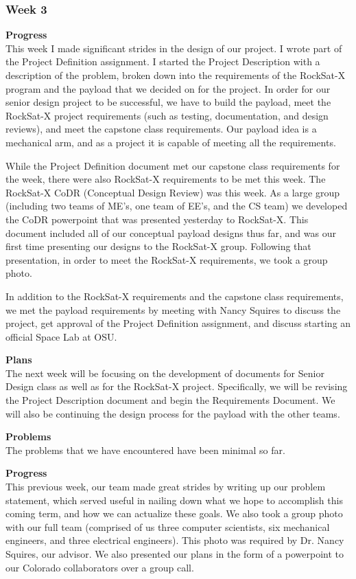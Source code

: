 \subsubsection{Week 3}
\textbf{Progress} \\
This week I made significant strides in the design of our project. I wrote part of the Project Definition assignment. I started the Project Description with a description of the problem, broken down into the requirements of the RockSat-X program and the payload that we decided on for the project. In order for our senior design project to be successful, we have to build the payload, meet the RockSat-X project requirements (such as testing, documentation, and design reviews), and meet the capstone class requirements. Our payload idea is a mechanical arm, and as a project it is capable of meeting all the requirements.

While the Project Definition document met our capstone class requirements for the week, there were also RockSat-X requirements to be met this week. The RockSat-X CoDR (Conceptual Design Review) was this week. As a large group (including two teams of ME's, one team of EE's, and the CS team) we developed the CoDR powerpoint that was presented yesterday to RockSat-X. This document included all of our conceptual payload designs thus far, and was our first time presenting our designs to the RockSat-X group. Following that presentation, in order to meet the RockSat-X requirements, we took a group photo.

In addition to the RockSat-X requirements and the capstone class requirements, we met the payload requirements by meeting with Nancy Squires to discuss the project, get approval of the Project Definition assignment, and discuss starting an official Space Lab at OSU.

\textbf{Plans} \\
The next week will be focusing on the development of documents for Senior Design class as well as for the RockSat-X project. Specifically, we will be revising the Project Description document and begin the Requirements Document. We will also be continuing the design process for the payload with the other teams.

\textbf{Problems} \\
The problems that we have encountered have been minimal so far.

\textbf{Progress} \\
This previous week, our team made great strides by writing up our problem statement, which served useful in nailing
 down what we hope to accomplish this coming term, and how we can actualize these goals. We also took a group photo 
 with our full team (comprised of us three computer scientists, six mechanical engineers, and three electrical 
 engineers). This photo was required by Dr. Nancy Squires, our advisor. We also presented our plans in the form of a 
 powerpoint to our Colorado collaborators over a group call.

